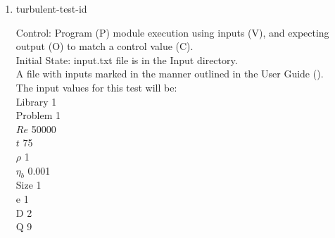\documentclass[12pt, titlepage]{article}
\newcommand{\famname}{Lattice Boltzmann Solver}
\newcounter{testcounter} %
\begin{document}
\begin{enumerate}
Test Case Derivation: This case is a comparison with the pseudo-oracle
pyLBM. The C values of this test for pyLBM can be found in the file
id5output.txt located in the OracleOutput folder. The output values of {\famname} will be compared to the pseudo-oracle output values.\\

This test covers a very small Reynolds number representing laminar flow.\\

How test will be performed: 

\begin{enumerate}
\item The Von Karman Vortex Street module shall be modified by the author to
  print the vorticity vector as output.
\item Outside of the system, the input parameter values will be written to a text file titled input.txt, as outlined in the User Guide.
\item The file will be placed into the Input directory, under the home directory
  of the project.
\item {\famname} shall be run.  
\item Upon completion of the module, the output values of the vorticity vector
  will be compared to the vorticity vector values from pyLBM - comparison will
  be done per cell. Comparisons can be done manually using Excel, or through a
  script, using the equation for relative error found in Section \ref{eqerror}.
\end{enumerate}

\item{turbulent-test-id\thetestcounter \\}

Control: Program (P) module execution using inputs (V), and expecting output (O)
to match a control value (C).\\
					
Initial State: input.txt file is in the Input directory.\\
					
A file with inputs marked in the manner outlined in the User
Guide (\citet{LBM_UserGuide_PM}).\\The input values for this test will be:\\
Library 1\\
Problem 1\\
$Re$ 50000\\
$t$ 75\\
$\rho$ 1\\
$\eta_b$ 0.001\\
Size 1\\
$\mathrm{e}$ 1\\
$\mathrm{D}$ 2\\
$\mathrm{Q}$ 9\\


\end{enumerate}
\end{document}
